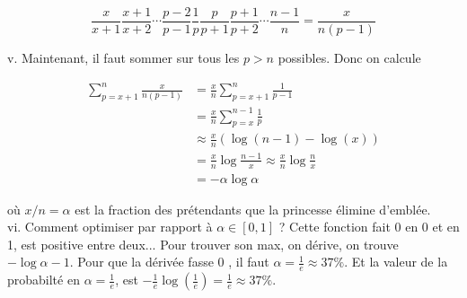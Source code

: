 \documentclass[11pt, a4paper, oneside]{article}
\theoremstyle{remark}
\theoremstyle{lemma}
\begin{document}
$$
\frac{x}{x+1} \frac{x+1}{x+2} \cdots \frac{p-2}{p-1} \frac{1}{p} \frac{p}{p+1} \frac{p+1}{p+2} \cdots \frac{n-1}{n}=\frac{x}{n(p-1)}
$$

v. Maintenant, il faut sommer sur tous les $p>n$ possibles. Donc on calcule

$$
\begin{aligned}
\sum_{p=x+1}^{n} \frac{x}{n(p-1)} & =\frac{x}{n} \sum_{p=x+1}^{n} \frac{1}{p-1} \\
& =\frac{x}{n} \sum_{p=x}^{n-1} \frac{1}{p} \\
& \approx \frac{x}{n}(\log (n-1)-\log (x)) \\
& =\frac{x}{n} \log \frac{n-1}{x} \approx \frac{x}{n} \log \frac{n}{x} \\
& =-\alpha \log \alpha
\end{aligned}
$$

où $x / n=\alpha$ est la fraction des prétendants que la princesse élimine d'emblée.\\
vi. Comment optimiser par rapport à $\alpha \in[0,1]$ ? Cette fonction fait 0 en 0 et en 1, est positive entre deux... Pour trouver son max, on dérive, on trouve $-\log \alpha-1$. Pour que la dérivée fasse 0 , il faut $\alpha=\frac{1}{e} \approx 37 \%$. Et la valeur de la probabilté en $\alpha=\frac{1}{e}$, est $-\frac{1}{e} \log \left(\frac{1}{e}\right)=\frac{1}{e} \approx 37 \%$.
\end{document}
